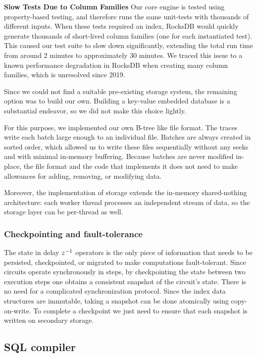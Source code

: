 \textbf{Slow Tests Due to Column Families} Our core engine is tested
using property-based testing, and therefore runs the same unit-tests
with thousands of different inputs.  When these tests required an
index, RocksDB would quickly generate thousands of short-lived column
families (one for each instantiated test).  This caused our test suite
to slow down significantly, extending the total run time from around 2
minutes to approximately 30 minutes.  We traced this issue to a known
performance degradation in RocksDB when creating many column families,
which is unresolved since 2019.

Since we could not find a suitable pre-existing storage system, the
remaining option was to build our own. Building a key-value embedded
database is a substantial endeavor, so we did not make this choice
lightly.

For this purpose, we implemented our own B-tree like file format. The
traces write each batch large enough to an individual file.  Batches
are always created in sorted order, which allowed us to write these
files sequentially without any seeks and with minimal in-memory
buffering.  Because batches are never modified in-place, the file
format and the code that implements it does not need to make
allowances for adding, removing, or modifying data.

Moreover, the implementation of storage extends the in-memory
shared-nothing architecture: each worker thread processes an
independent stream of data, so the storage layer can be per-thread as
well.

\subsubsection{Checkpointing and fault-tolerance}

The state in delay $z^{-1}$ operators is the only piece of information
that needs to be persisted, checkpointed, or migrated to make \dbsp
computations fault-tolerant.  Since \dbsp circuits operate
synchronously in steps, by checkpointing the state between two
execution steps one obtains a consistent snapshot of the circuit's
state.  There is no need for a complicated synchronization protocol.
Since the index data structures are immutable, taking a snapshot can
be done atomically using copy-on-write.  To complete a checkpoint we
just need to ensure that each snapshot is written on secondary
storage.

\subsection{SQL compiler}


